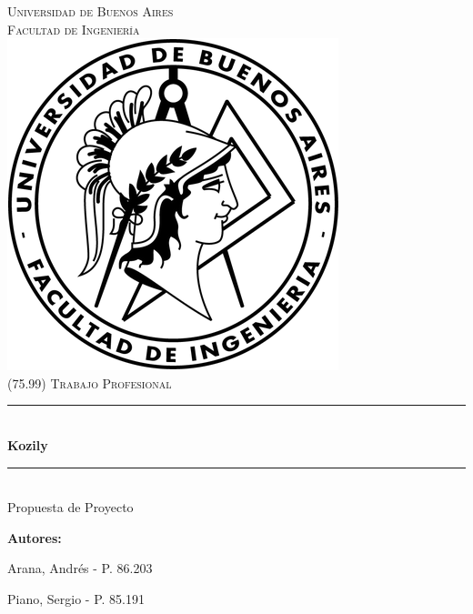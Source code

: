 \documentclass[a4paper,11pt]{article}
\begin{document}

\thispagestyle{empty}

\begin{titlepage}

\newcommand{\HRule}{\rule{\linewidth}{0.5mm}}
\newenvironment{bottompar}{\par\vspace*{\fill}}{\clearpage}

\center

\textsc{\LARGE Universidad de Buenos Aires}\\[0.5cm]
\textsc{\Large Facultad de Ingeniería}\\[1.5cm]

\includegraphics[scale=0.5]{assets/logo.png}\\[1cm]


\textsc{\large (75.99) Trabajo Profesional}\\[0.25cm]
\HRule \\[0.4cm]
{\huge \bfseries Kozily}
\HRule \\[0.4cm]

{\large Propuesta de Proyecto}

\begin{bottompar}
\flushleft
{\bfseries Autores:}

Arana, Andrés          - P. 86.203

Piano, Sergio          - P. 85.191
\end{bottompar}

\end{titlepage}
\end{document}
